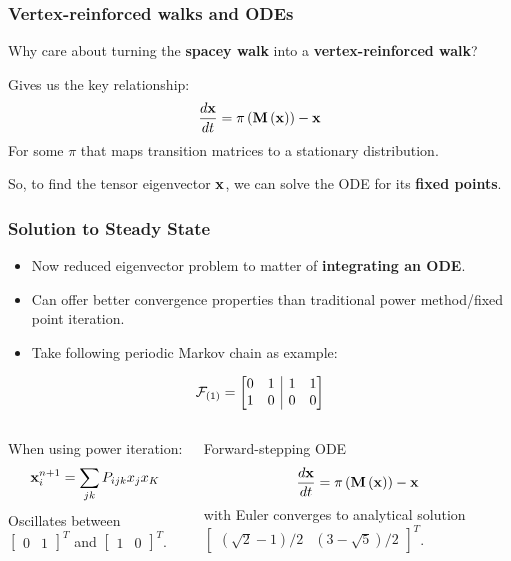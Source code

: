 \documentclass{beamer}
\begin{document}
\begin{frame}
  \frametitle{Vertex-reinforced walks and ODEs}
  Why care about turning the \textbf{spacey walk} into a \textbf{vertex-reinforced walk}?
  \begin{block}{}
    Gives us the key relationship:
    \[ \frac{d{\bf x}}{dt} = \pi\left({\bf M}\left({\bf x}\right)\right) - {\bf x} \]
    For some $\pi$ that maps transition matrices to a stationary distribution.
  \end{block}
  So, to find the tensor eigenvector ${\bf x}$, we can solve the ODE for its \textbf{fixed points}.
\end{frame}


\begin{frame}
  \frametitle{Solution to Steady State}
  \begin{itemize}
  \item Now reduced eigenvector problem to matter of \textbf{integrating an ODE}.
  \item Can offer better convergence properties than traditional power method/fixed point iteration.
  \item Take following periodic Markov chain as example:
  \end{itemize}
  \[ \mathcal{F}_{\left(1\right)} =
    \left[
      \begin{array}{@{}cc|cc@{}}
        0 & 1 & 1 & 1 \\
        1 & 0 & 0 & 0
      \end{array}
    \right]
  \]

  \begin{columns}
    \begin{column}{0.5\linewidth}
      When using power iteration:
      \[ {\bf x}^{n+1}_i = \sum_{jk} P_{ijk}x_jx_K \]
      Oscillates between $\begin{bmatrix}0&1\end{bmatrix}^T$ and $\begin{bmatrix}1&0\end{bmatrix}^T$.
    \end{column}
    \begin{column}{0.5\linewidth}
      Forward-stepping ODE
      \[ \frac{d{\bf x}}{dt} = \pi\left({\bf M}\left({\bf x}\right)\right) - {\bf x} \]
      with Euler converges to analytical solution $\begin{bmatrix} \left(\sqrt{2}-1\right)/2 & \left(3-\sqrt{5}\right)/2  \end{bmatrix}^T$.
    \end{column}
  \end{columns}
\end{frame}
\end{document}
